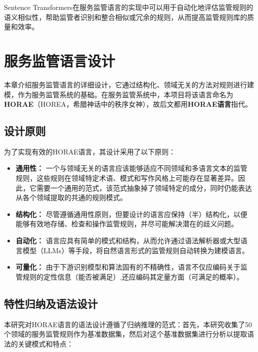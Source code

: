 Sentence Transformers在服务监管语言的实现中可以用于自动化地评估监管规则的语义相似性，帮助监管者识别和整合相似或冗余的规则，从而提高监管规则库的质量和效率。

\cleardoublepage

\section{服务监管语言设计}

本章介绍服务监管语言的详细设计，它通过结构化、领域无关的方法对规则进行建模，作为服务监管系统的基础。在服务监管系统中，本项目将该语言命名为\textbf{HORAE}（HOREA，希腊神话中的秩序女神），故后文都用\textbf{HORAE语言}指代。

\subsection{设计原则}

为了实现有效的HORAE语言，其设计采用了以下原则：

\begin{itemize}
    \item \textbf{通用性：} 一个与领域无关的语言应该能够适应不同领域和多语言文本的监管规则，这些规则在领域特定术语、模式和写作风格上可能存在显著差异。因此，它需要一个通用的范式，该范式抽象掉了领域特定的成分，同时仍能表达从各个领域提取的共通的规则模式。
    \item \textbf{结构化：} 尽管遵循通用性原则，但要设计的语言应保持（半）结构化，以便能够有效地存储、检查和操作监管规则，并尽可能解决潜在的歧义问题。
    \item \textbf{自动化：} 语言应具有简单的模式和结构，从而允许通过语法解析器或大型语言模型（LLMs）等手段，将自然语言形式的监管规则自动转换为建模语言。
    \item \textbf{可量化：} 由于下游识别模型和算法固有的不精确性，语言不仅应编码关于监管规则的定性信息（能否被满足）,还应编码其定量方面（可满足的概率）。
\end{itemize}

\subsection{特性归纳及语法设计}

本研究对HORAE语言的语法设计遵循了归纳推理的范式：首先，本研究收集了50个领域的服务监管规则作为基准数据集，然后对这个基准数据集进行分析以提取语法的关键模式和特点：

